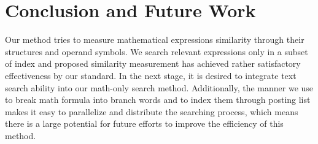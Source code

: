 \documentclass{acm_proc_article-sp}
\begin{document}
\section{Conclusion and Future Work}
Our method tries to measure mathematical expressions similarity through their structures and operand symbols. 
We search relevant expressions only in a subset of index and proposed similarity measurement has achieved rather satisfactory effectiveness by our standard.
In the next stage, it is desired to integrate text search ability into our math-only search method. 
Additionally, the manner we use to break math formula into branch words and to index them through posting list makes it easy to parallelize and distribute the searching process,
which means there is a large potential for future efforts to improve the efficiency of this method.


\end{document}
